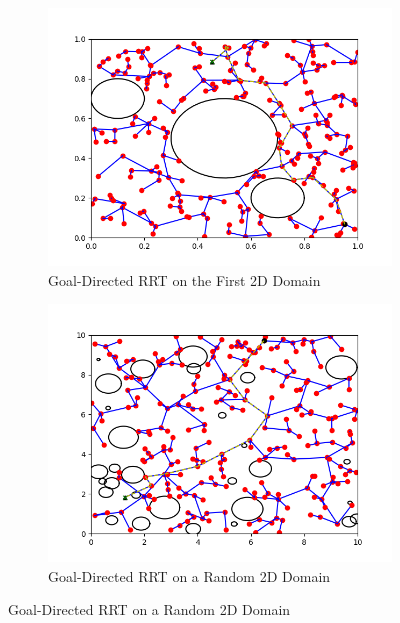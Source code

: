 \documentclass{article}
\begin{document}
\begin{enumerate}[(a)]
\begin{figure}[h!]
    \centering
    \begin{subfigure}{0.45\textwidth}
        \centering
        \includegraphics[width=\textwidth]{../figures/rrt_run3.png}
        \caption{Goal-Directed RRT on the First 2D Domain}
    \end{subfigure}
    \hspace{0.2in}
    \begin{subfigure}{0.45\textwidth}
        \centering
        \includegraphics[width=\textwidth]{../figures/rrt_run4.png}
        \caption{Goal-Directed RRT on a Random 2D Domain}
    \end{subfigure}
\end{figure}



\end{enumerate}
\end{document}
